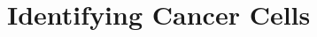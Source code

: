\documentclass[8pt,aspectratio=169]{beamer}
\begin{document}







\section{Identifying Cancer Cells}

\end{document}
